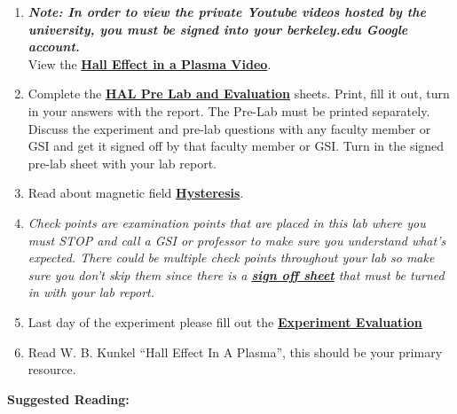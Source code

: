 \documentclass{../lab}
\begin{document}
\begin{enumerate}
    \item \emph{\textbf{Note: In order to view the private Youtube videos hosted by the university, you must be signed into your berkeley.edu Google account.}} \\
    View the \href{http://youtu.be/iZkOlZDyb2U}{\textbf{Hall Effect in a Plasma Video}}.

    \item Complete the \href{http://experimentationlab.berkeley.edu/HALPreLab}{\textbf{HAL Pre Lab and Evaluation}} sheets. Print, fill it out, turn in your answers with the report. The Pre-Lab must be printed separately. Discuss the experiment and pre-lab questions with any faculty member or GSI and get it signed off by that faculty member or GSI. Turn in the signed pre-lab sheet with your lab report.

    \item Read about magnetic field \href{http://experimentationlab.berkeley.edu/hysteresis}{\textbf{Hysteresis}}.

    \item \emph{Check points are examination points that are placed in this lab where you must STOP and call a GSI or professor to make sure you understand what's expected. There could  be multiple check points throughout your lab so make sure you don't skip them since there is a \href{http://experimentationlab.berkeley.edu/halcheckpoints}{\textbf{sign off sheet}} that must be turned in with your lab report.}

    \item Last day of the experiment please fill out the \href{\ExperimentEvaluation}{\textbf{Experiment Evaluation}}

    \item Read W. B. Kunkel ``Hall Effect In A Plasma'', this should be your primary resource.

\end{enumerate}

\noindent\textbf{Suggested Reading:}
\end{document}
